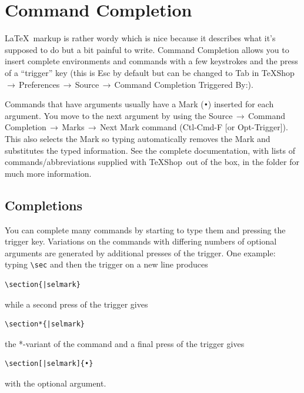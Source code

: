 \documentclass[letterpaper,11pt]{article}
\newcommand{\TS}{\textsf{\TeX Shop}}
\newcommand{\cmd}[1]{\textsf{#1}}
\newcommand{\mnu}[1]{\textsf{#1}}
\newcommand{\To}{\,\(\to\)\,}
\begin{document}
\section{Command Completion}\label{sec:CC}

\LaTeX\ markup is rather wordy which is nice because it describes what it's supposed to do but a bit painful to write. Command Completion allows you to insert complete environments and commands with a few keystrokes and the press of a ``trigger'' key (this is \cmd{Esc} by default but can be changed to \cmd{Tab} in \mnu{TeXShop}\To\mnu{Preferences}\To\mnu{Source}\To\mnu{Command Completion Triggered By:}).

Commands that have arguments usually have a Mark (\texttt{•}) inserted for each argument. You move to the next argument by using the \mnu{Source}\To\mnu{Command Completion}\To\mnu{Marks}\To\mnu{Next Mark} command (\cmd{Ctl-Cmd-F} [or \cmd{Opt-Trigger}]). This also selects the Mark so typing automatically removes the Mark and substitutes the typed information. See the complete documentation, with lists of commands/abbreviations supplied with \TS\ out of the box, in the  folder for much more information.

\subsection{Completions}

You can complete many commands by starting to type them and pressing the trigger key. Variations on the commands with differing numbers of optional arguments are generated by additional presses of the trigger. One example: typing \verb|\sec| and then the trigger on a new line produces
\begin{verbatim}
\section{|selmark}
\end{verbatim}
while a second press of the trigger gives
\begin{verbatim}
\section*{|selmark}
\end{verbatim}
the *-variant of the command and a final press of the trigger gives
\begin{verbatim}
\section[|selmark]{•}
\end{verbatim}
with the optional argument.
\end{document}
